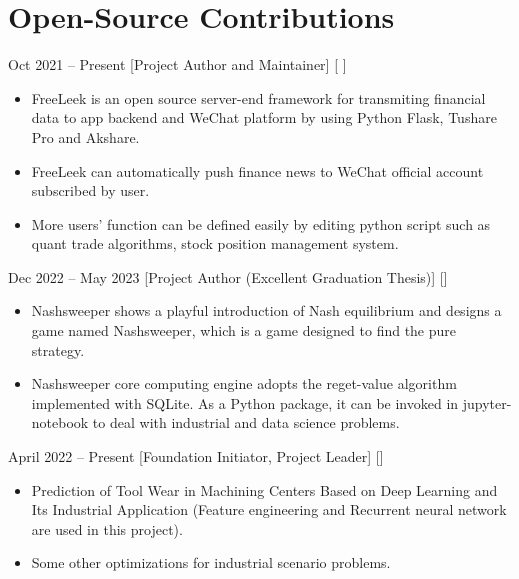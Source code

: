 \documentclass{chicv}
\begin{document}
\section{Open-Source Contributions}
%
%
  {Oct 2021 -- Present}
  [Project Author and Maintainer]
  [ ]
  \begin{itemize}
    \item FreeLeek is an open source server-end framework for transmiting financial data to app backend and WeChat platform by using Python Flask, Tushare Pro and Akshare.
    \item FreeLeek can automatically push finance news to WeChat official account subscribed by user.
    \item More users' function can be defined easily by editing python script such as quant trade algorithms, stock position management system.
  \end{itemize}
%
%
  {Dec 2022 -- May 2023}
  [Project Author (Excellent Graduation Thesis)]
  []
  \begin{itemize}
    \item Nashsweeper shows a playful introduction of Nash equilibrium and designs a game named Nashsweeper, which is a game designed to find the pure strategy.  
    \item Nashsweeper core computing engine adopts the reget-value algorithm implemented with SQLite. As a Python package, it can be invoked in jupyter- notebook to deal with industrial and data science problems.
  \end{itemize}
%
%
%
  {April 2022 -- Present}
  [Foundation Initiator, Project Leader]
  []
  \begin{itemize}
    \item Prediction of Tool Wear in Machining Centers Based on Deep Learning and Its Industrial Application (Feature engineering and Recurrent neural network are used in this project). 
    \item Some other optimizations for industrial scenario problems.
  \end{itemize}
%
%
%
\end{document}
